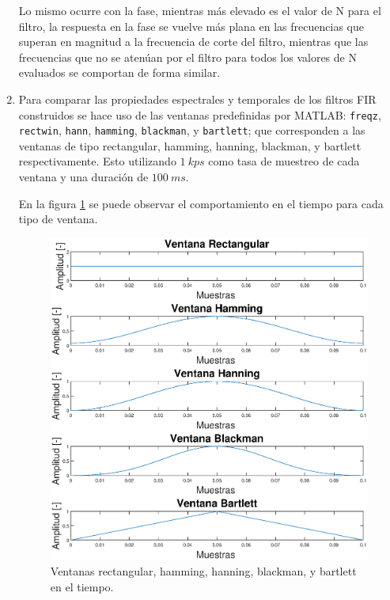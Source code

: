 \begin{enumerate}
Lo mismo ocurre con la fase, mientras más elevado es el valor de N para el filtro, la respuesta en la fase se vuelve más plana en las frecuencias que superan en magnitud a la frecuencia de corte del filtro, mientras que las frecuencias que no se atenúan por el filtro para todos los valores de N evaluados se comportan de forma similar.



\item Para comparar las propiedades espectrales y temporales de los filtros FIR construidos se hace uso de las ventanas predefinidas por MATLAB:  \texttt{freqz}, \texttt{rectwin}, \texttt{hann}, \texttt{hamming},
\texttt{blackman}, y \texttt{bartlett}; que corresponden a las ventanas de tipo   rectangular, hamming, hanning, blackman, y bartlett respectivamente.  Esto utilizando $1 ~kps$ como tasa de muestreo de cada ventana y una duración de $100~ms$.

En la figura \ref{ventanas_tiempo} se puede observar el comportamiento en el tiempo para cada tipo de ventana.

\begin{figure}[H]
    \centering
    \includegraphics[scale = 0.5]{Figuras/p2_2-Ventanas-tiempo.eps}
    \caption{Ventanas rectangular, hamming, hanning, blackman, y bartlett en el tiempo.}
    \label{ventanas_tiempo}
\end{figure}



\end{enumerate}
